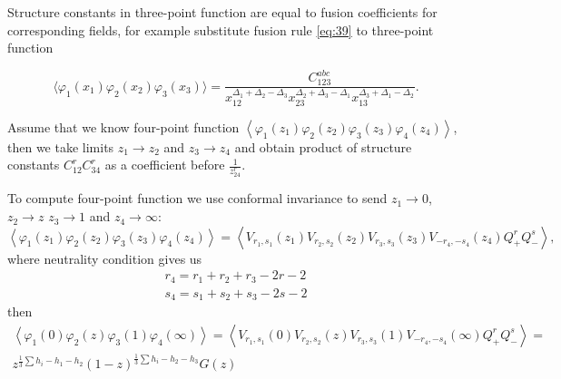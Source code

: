 \documentclass[a4paper,12pt]{article}
\theoremstyle{definition}
\theoremstyle{definition}
\theoremstyle{definition}
\begin{document}
Structure constants in three-point function are equal to fusion coefficients for corresponding
fields, for example substitute fusion rule \eqref{eq:39} to three-point function

  \begin{equation}
    \label{eq:56}
    \langle
    \varphi_{1}(x_{1})\varphi_{2}(x_{2})\varphi_{3}(x_{3})\rangle=\frac{C^{abc}_{123}}{x_{12}^{\Delta_{1}+\Delta_{2}-\Delta_{3}}
      x_{23}^{\Delta_{2}+\Delta_{3}-\Delta_{1}}x_{13}^{\Delta_{3}+\Delta_{1}-\Delta_{2}}}.     
  \end{equation}


Assume that we know four-point function
$\left<\varphi_{1}(z_{1})\varphi_{2}(z_{2})\varphi_{3}(z_{3})\varphi_{4}(z_{4})\right>$, then we
take limits $z_{1}\to z_{2}$ and $z_{3}\to z_{4}$ and obtain product of structure constants
$C_{12}^{r}C_{34}^{r}$ as a coefficient before $\frac{1}{z_{24}^{r}}$.

To compute four-point function we use conformal invariance to send $z_{1}\to 0$, $z_{2}\to z$
$z_{3}\to 1$ and $z_{4}\to \infty$:
\begin{equation}
  \label{eq:58}
  \left<\varphi_{1}(z_{1})\varphi_{2}(z_{2})\varphi_{3}(z_{3})\varphi_{4}(z_{4})\right>=\left<
    V_{r_{1},s_{1}}(z_{1}) V_{r_{2},s_{2}}(z_{2}) V_{r_{3},s_{3}}(z_{3}) V_{-r_{4},-s_{4}}(z_{4})
    Q_{+}^{r} Q_{-}^{s}\right>,
\end{equation}
where neutrality condition gives us
\begin{equation}
  \label{eq:59}
  \begin{array}{c}
    r_{4}=r_{1}+r_{2}+r_{3}-2r-2\\
    s_{4}=s_{1}+s_{2}+s_{3}-2s-2
  \end{array}
\end{equation}
then 
\begin{multline}
  \label{eq:58}
  \left<\varphi_{1}(0)\varphi_{2}(z)\varphi_{3}(1)\varphi_{4}(\infty)\right>=\left<
    V_{r_{1},s_{1}}(0) V_{r_{2},s_{2}}(z) V_{r_{3},s_{3}}(1) V_{-r_{4},-s_{4}}(\infty)
    Q_{+}^{r} Q_{-}^{s}\right>=\\
  z^{\frac{1}{3}\sum h_{i}-h_{1}-h_{2}}(1-z)^{\frac{1}{3}\sum h_{i}-h_{2}-h_{3}} G(z)
\end{multline}
\end{document}
